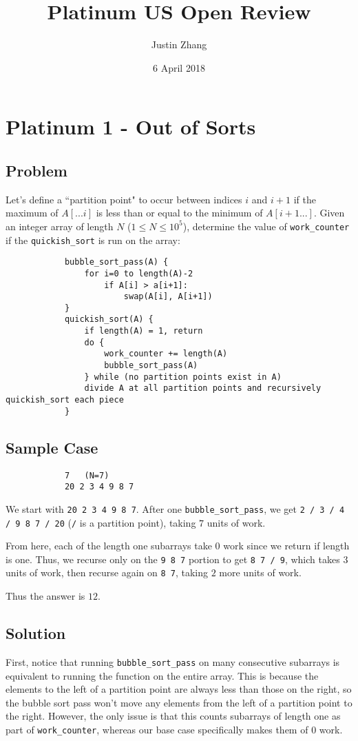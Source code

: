 \documentclass[11pt]{article}
\title{Platinum US Open Review}
\author{Justin Zhang}
\date{6 April 2018}
\begin{document}
\maketitle


\section{Platinum 1 - Out of Sorts}
    \subsection{Problem}
        Let's define a ``partition point" to occur between indices $i$ and $i+1$ if the maximum of $A[...i]$ is less than or equal to the minimum of $A[i+1...]$. Given an integer array of length $N$ ($1 \leq N \leq 10^5$), determine the value of \verb|work_counter| if the \verb|quickish_sort| is run on the array:
        
        \begin{verbatim}
            bubble_sort_pass(A) {
                for i=0 to length(A)-2
                    if A[i] > a[i+1]:
                        swap(A[i], A[i+1])
            }
            quickish_sort(A) {
                if length(A) = 1, return
                do {
                    work_counter += length(A)
                    bubble_sort_pass(A)
                } while (no partition points exist in A)
                divide A at all partition points and recursively quickish_sort each piece
            }
        \end{verbatim}
    \subsection{Sample Case}
        \begin{verbatim}
            7   (N=7)
            20 2 3 4 9 8 7
        \end{verbatim}
        We start with \verb|20 2 3 4 9 8 7|. After one \verb|bubble_sort_pass|, we get \verb|2 / 3 / 4 / 9 8 7 / 20| (\verb|/| is a partition point), taking $7$ units of work.
        
        From here, each of the length one subarrays take $0$ work since we return if length is one. Thus, we recurse only on the \verb|9 8 7| portion to get \verb|8 7 / 9|, which takes $3$ units of work, then recurse again on \verb|8 7|, taking $2$ more units of work.
        
        Thus the answer is $12$.
    \subsection{Solution}
        First, notice that running \verb|bubble_sort_pass| on many consecutive subarrays is equivalent to running the function on the entire array. This is because the elements to the left of a partition point are always less than those on the right, so the bubble sort pass won't move any elements from the left of a partition point to the right. However, the only issue is that this counts subarrays of length one as part of \verb|work_counter|, whereas our base case specifically makes them of $0$ work.
        
\end{document}
